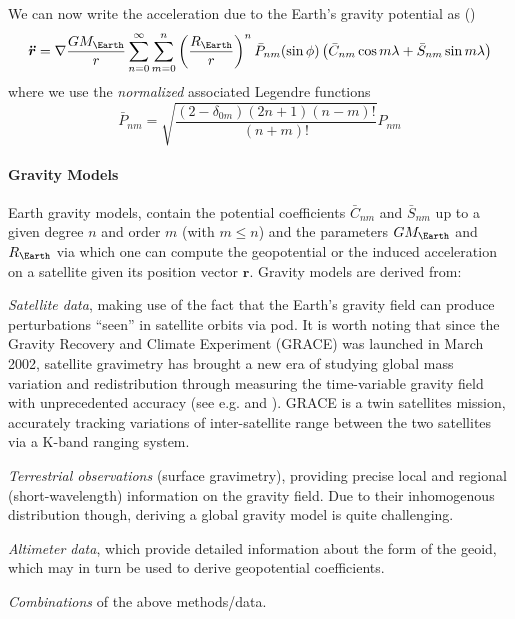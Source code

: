 We can now write the acceleration due to the Earth's gravity potential as 
(\cite{Montenbruck2000})
\begin{equation}
  \bm{\ddot{r}} = \nabla \frac{GM_{\Earth}}{r} \sum_{n=0}^{\infty} \sum_{m=0}^{n} 
    \left(\frac{R_{\Earth}}{r}\right) ^n \bar{P}_{nm} (\sin \phi )
    \left( \bar{C}_{nm} \cos{m\lambda} + \bar{S}_{nm} \sin{m\lambda} \right)
\end{equation}
where we use the \emph{normalized} associated Legendre functions
\begin{equation}
  \bar{P}_{nm} = \sqrt{\frac{\left(2-\delta _{0m}\right) \left(2n+1\right) \left(n-m\right)!}{(n+m)!}} P_{nm}
\end{equation}

\paragraph{Gravity Models}
\label{par:gravity-models}

Earth gravity models, contain the potential coefficients $\bar{C}_{nm}$ and $\bar{S}_{nm}$ 
up to a given degree $n$ and order $m$ (with $m \le n$) and the parameters $GM_{\Earth}$ 
and $R_{\Earth}$ via which one can compute the geopotential or the induced acceleration 
on a satellite given its position vector $\bm{r}$. Gravity models are derived from:
\begin{description}
  \item \emph{Satellite data}, making use of the fact that the Earth's gravity field 
    can produce perturbations ``seen'' in satellite orbits via \gls{pod}. It is worth 
    noting that since the Gravity Recovery and Climate Experiment (GRACE) was launched 
    in March 2002, satellite gravimetry has brought a new era of studying global mass 
    variation and redistribution through measuring the time-variable gravity field with 
    unprecedented accuracy (see e.g. \cite{Chen2022} and \cite{Jaggi2023}). GRACE is a 
    twin satellites mission, accurately tracking variations of inter-satellite range between 
    the two satellites via a K-band ranging system.
  \item \emph{Terrestrial observations} (surface gravimetry), providing precise local 
    and regional (short-wavelength) information on the gravity field. Due to their 
    inhomogenous distribution though, deriving a global gravity model is quite challenging.
  \item \emph{Altimeter data}, which provide detailed information about the form of the 
    geoid, which may in turn be used to derive geopotential coefficients.
  \item \emph{Combinations} of the above methods/data.
\end{description}

